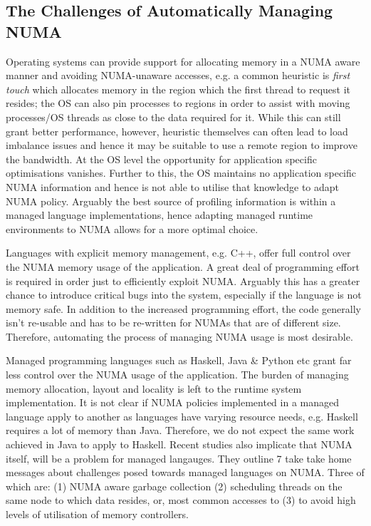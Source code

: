 \documentclass{paper}\usepackage{graphicx}
\begin{document}
\subsection{The Challenges of Automatically Managing NUMA}
\label{sec:issues}

Operating systems can provide support for allocating memory in a NUMA aware manner and avoiding NUMA-unaware accesses, e.g. a common heuristic is \textit{first touch} which allocates memory in the region which the first thread to request it resides; the OS can also pin processes to regions in order to assist with moving processes/OS threads as close to the data required for it. While this can still grant better performance, however, heuristic themselves can often lead to load imbalance issues and hence it may be suitable to use a remote region\cite{DBLP:conf/iwmm/MajoG11} to improve the bandwidth. At the OS level the opportunity for application specific optimisations vanishes. Further to this, the OS maintains no application specific NUMA information and hence is not able to utilise that knowledge to adapt NUMA policy. Arguably the best source of profiling information is within a managed language implementations, hence adapting managed runtime environments to NUMA allows for a more optimal choice. 


Languages with explicit memory management, e.g. C++, offer full control over the NUMA memory usage of the application. A great deal of programming effort is required in order just to efficiently exploit NUMA. Arguably this has a greater chance to introduce critical bugs into the system, especially if the language is not memory safe\cite{DBLP:conf/asplos/Shapiro06,DBLP:conf/oopsla/Kell17}. In addition to the increased programming effort, the code generally isn't re-usable and has to be re-written for NUMAs that are of different size. Therefore, automating the process of managing NUMA usage is most desirable.

Managed programming languages such as Haskell, Java \& Python etc grant far less control over the NUMA usage of the application. The burden of managing memory allocation, layout and locality is left to the runtime system implementation. It is not clear if NUMA policies implemented in a managed language apply to another as languages have varying resource needs, e.g. Haskell requires a lot of memory than Java. Therefore, we do not expect the same work achieved in Java to apply to Haskell. Recent studies also implicate that NUMA itself, will be a problem for managed langauges\cite{DBLP:conf/pppj/PapadakisZFK20}. They outline 7 take take home messages about challenges posed towards managed languages on NUMA. Three of which are: (1) NUMA aware garbage collection (2) scheduling threads on the same node to which data resides, or, most common accesses to (3) to avoid high levels of utilisation of memory controllers.
\end{document}
